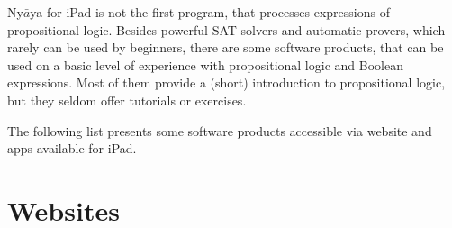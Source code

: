
Ny$\bar{a}$ya for iPad is not the first program,  that processes expressions of propositional logic. 
Besides powerful SAT-solvers and automatic provers, which rarely can be used by beginners,
there are some software products, that can be used on a basic level of experience with propositional logic and Boolean expressions.  
Most of them provide a (short) introduction to propositional logic, but they seldom offer tutorials or exercises. 	

The following list presents some software products accessible
via website and apps available for iPad.

\section{Websites}

